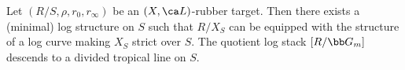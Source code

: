 \begin{lemma}
\notready\label{bbll}
Let $(R/S, \rho, r_0, r_\infty)$ be an $(X, \ca L)$-rubber target. Then there exists a (minimal) log structure on $S$ such that $R/X_S$ can be equipped with the structure of  a log curve making $X_S$ strict over $S$. The quotient log stack $[R/\bb G_m]$ descends to a divided tropical line on $S$.
\end{lemma}
